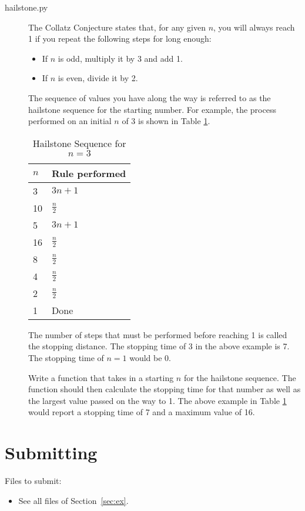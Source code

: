 \documentclass[11pt]{cselabheader}
\begin{document}
\begin{description}
\item[hailstone.py] The Collatz Conjecture states that, for any given $n$,
  you will always reach 1 if you repeat the following steps for long enough:
  \begin{itemize}
  \item If $n$ is odd, multiply it by 3 and add 1.
  \item If $n$ is even, divide it by 2.
  \end{itemize}
  The sequence of values you have along the way is referred to as the hailstone
  sequence for the starting number. For example, the process performed on an initial $n$ of 3 is shown in Table \ref{ex:hailstone}.

  \begin{table}[!ht]
    \centering
    \begin{tabular}{ll}
      \toprule
      $n$ & Rule performed\\
      \midrule
      3 & $3n + 1$\\
      10 & $\frac{n}{2}$\\
      5 & $3n + 1$\\
      16 & $\frac{n}{2}$\\
      8 & $\frac{n}{2}$\\
      4 & $\frac{n}{2}$\\
      2 & $\frac{n}{2}$\\
      1 & Done\\
      \bottomrule
    \end{tabular}
    \caption{Hailstone Sequence for $n = 3$}
    \label{ex:hailstone}
  \end{table}

  The number of steps that must be performed before
  reaching 1 is called the stopping distance. The stopping
  time of 3 in the above example is 7. The stopping
  time of $n = 1$ would be 0.

  Write a function that takes in a starting $n$ for the
  hailstone sequence. The function should then calculate the
  stopping time for that number as well as the largest value
  passed on the way to 1. The above example in Table \ref{ex:hailstone}
  would report a stopping time of 7 and a maximum value of 16.
\end{description} 

\section{Submitting}

Files to submit:
\begin{itemize}
\item See all files of Section~\ref{sec:ex}.
\end{itemize}
\end{document}
